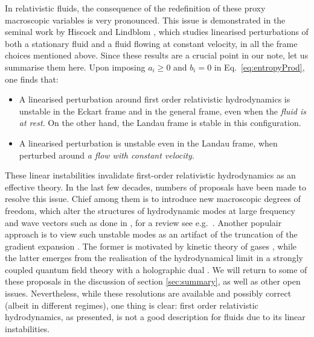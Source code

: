 \documentclass[superscriptaddress,prd,nofootinbib,preprintnumbers,longbibliography,11pt,eqsecnum]{revtex4-1}
\begin{document}
In relativistic fluids, the consequence of the redefinition of these proxy macroscopic variables is very pronounced. This issue is demonstrated in the seminal work by Hiscock and Lindblom \cite{Hiscock:1985zz}, which studies linearised perturbations of both a stationary fluid and a fluid flowing at constant velocity, in all the frame choices mentioned above. Since these results are a crucial point in our note, let us summarise them here. Upon imposing $a_i \ge 0$ and $b_i =0$ in Eq.~\eqref{eq:entropyProd}, one finds that:
\begin{itemize}
  \item A linearised perturbation around first order relativistic hydrodynamics is unstable in the Eckart frame and in the general frame, even when the \textit{fluid is at rest}. On the other hand, the Landau frame is stable in this configuration.
  \item A linearised perturbation is unstable even in the Landau frame, when perturbed around \textit{a flow with constant velocity}.   
\end{itemize}
These linear instabilities invalidate first-order relativistic hydrodynamics as an effective theory. In the last few decades, numbers of proposals have been made to resolve this issue. Chief among them is to introduce new macroscopic degrees of freedom, which alter the structures of hydrodynamic modes at large frequency and wave vectors such as done in \cite{Muller:1967zza,Israel:1976tn,Israel:1979wp,Liu:1986,Geroch:1990bw}, for a review see e.g.~\cite{rezzolla2013relativistic}. Another populair approach is to view such unstable modes as an artifact of the truncation of the gradient expansion \cite{Baier:2007ix,Grozdanov:2015kqa,Heller:2013fn,Withers:2018srf,Grozdanov:2019kge}. The former is motivated by kinetic theory of gases \cite{grad-1963}, while the latter emerges from the realisation of the hydrodynamical limit in a strongly coupled quantum field theory with a holographic dual \cite{Policastro:2002se,Bhattacharyya:2008jc}. We will return to some of these proposals in the discussion of section \ref{sec:summary}, as well as other open issues. Nevertheless, while these resolutions are available and possibly correct (albeit in different regimes), one thing is clear: first order relativistic hydrodynamics, as presented, is not a good description for fluids due to its linear instabilities.
\end{document}

